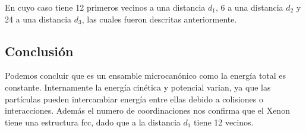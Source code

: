 \documentclass[10pt,letterpaper,twocolumn]{article}
\begin{document}
En cuyo caso tiene 12 primeros vecinos a una distancia $d_{1}$, 6 a una distancia 
$d_{2}$ y 24 a una distancia $d_{3}$, las cuales fueron descritas anteriormente.

\subsection*{Conclusión}

Podemos concluir que es un ensamble microcanónico como la energía total 
es constante. Internamente la energía cinética y potencial varian, ya que las 
partículas pueden intercambiar energía entre ellas debido a colisiones 
o interacciones. Además el numero de coordinaciones nos confirma que el Xenon 
tiene una estructura fcc, dado que a la distancia $d_{1}$ tiene 12 vecinos.
\end{document}
